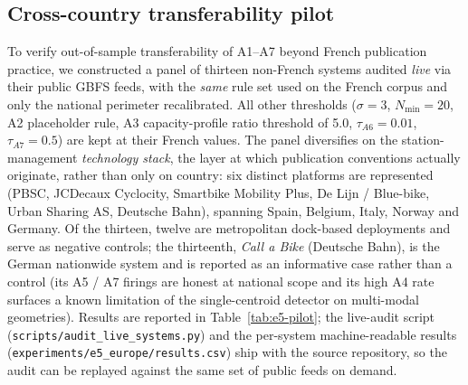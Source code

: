 \documentclass[11pt,a4paper]{article}
\begin{document}
\subsection{Cross-country transferability pilot}
To verify out-of-sample transferability of A1--A7 beyond French
publication practice, we constructed a panel of thirteen non-French
systems audited \emph{live} via their public GBFS feeds, with the
\emph{same} rule set used on the French corpus and only the
national perimeter recalibrated. All other thresholds ($\sigma =
3$, $N_{\min} = 20$, A2 placeholder rule, A3 capacity-profile
ratio threshold of 5.0, $\tau_{A6} = 0.01$, $\tau_{A7} = 0.5$) are
kept at their French values. The panel diversifies on the
station-management \emph{technology stack}, the layer at which
publication conventions actually originate, rather than only on
country: six distinct platforms are represented (PBSC, JCDecaux
Cyclocity, Smartbike Mobility Plus, De Lijn / Blue-bike, Urban
Sharing AS, Deutsche Bahn), spanning Spain, Belgium, Italy,
Norway and Germany. Of the thirteen, twelve are metropolitan
dock-based deployments and serve as negative controls; the
thirteenth, \emph{Call a Bike} (Deutsche Bahn), is the German
nationwide system and is reported as an informative case rather
than a control (its A5 / A7 firings are honest at national scope
and its high A4 rate surfaces a known limitation of the
single-centroid detector on multi-modal geometries). Results are
reported in Table~\ref{tab:e5-pilot}; the live-audit script
(\texttt{scripts/audit\_live\_systems.py}) and the per-system
machine-readable results
(\texttt{experiments/e5\_europe/results.csv}) ship with the source
repository, so the audit can be replayed against the same set of
public feeds on demand.
\end{document}
